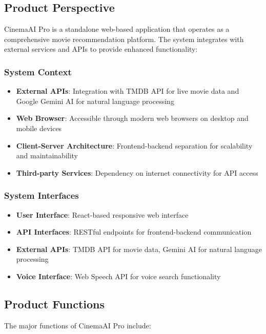 \documentclass[12pt,a4paper]{article}
\begin{document}
\subsection{Product Perspective}
CinemaAI Pro is a standalone web-based application that operates as a comprehensive movie recommendation platform. The system integrates with external services and APIs to provide enhanced functionality:

\subsubsection{System Context}
\begin{itemize}
    \item \textbf{External APIs}: Integration with TMDB API for live movie data and Google Gemini AI for natural language processing
    \item \textbf{Web Browser}: Accessible through modern web browsers on desktop and mobile devices
    \item \textbf{Client-Server Architecture}: Frontend-backend separation for scalability and maintainability
    \item \textbf{Third-party Services}: Dependency on internet connectivity for API access
\end{itemize}

\subsubsection{System Interfaces}
\begin{itemize}
    \item \textbf{User Interface}: React-based responsive web interface
    \item \textbf{API Interfaces}: RESTful endpoints for frontend-backend communication
    \item \textbf{External APIs}: TMDB API for movie data, Gemini AI for natural language processing
    \item \textbf{Voice Interface}: Web Speech API for voice search functionality
\end{itemize}

\subsection{Product Functions}
The major functions of CinemaAI Pro include:
\end{document}
